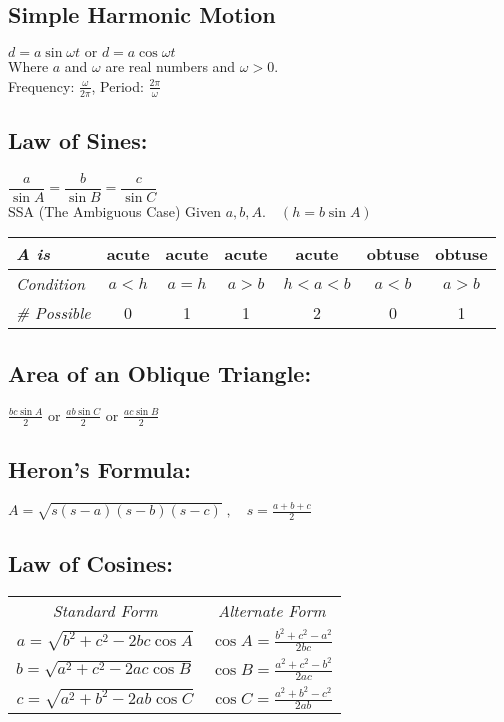 \documentclass{amsart}
\begin{document}
\begin{multicols}{2}
    \subsection*{Simple Harmonic Motion}$d=a\sin\omega t\text{ or }d=a\cos\omega t$\hfill \\
    Where $a$ and $\omega$ are real numbers and $\omega > 0$.\\
    Frequency: $\frac{\omega}{2\pi}$, Period: $\frac{2\pi}{\omega}$
    \subsection*{ Law of Sines:}
    $\dfrac{a}{\sin A}=\dfrac{b}{\sin B}=\dfrac{c}{\sin C}$\medskip\\
    SSA (The Ambiguous Case) \hskip 6pt Given $a, b, A.\quad (h=b\sin A)$
    \begin{center}
    \begin{small}\begin{tabular}[c]{|l|cccccc|}\hline
        \textit{A is}&acute&acute&acute&acute&obtuse&obtuse\\\hline
        \textit{Condition}&$a<h$&$a=h$&$a>b$&$h<a<b$&$a<b$&$a>b$\\
        \textit{\# Possible}&0&1&1&2&0&1\\\hline
    \end{tabular}\end{small}
    \end{center}
    \subsection*{Area of an Oblique Triangle:}$\frac{bc\sin A}{2}$ or $\frac{ab\sin C}{2}$ or $\frac{ac\sin B}{2}$
    \subsection*{Heron's Formula:} $A=\sqrt{s(s-a)(s-b)(s-c)}\;,\quad s=\frac{a+b+c}{2}$
    \subsection*{Law of Cosines:}
    \begin{center}
    \begin{tabular}[c]{cc}
        \large{\textit{Standard Form}} &\large{\textit{Alternate Form}}\\
        $a=\sqrt{b^2+c^2-2bc\cos A}$&$\cos A=\frac{b^2+c^2-a^2}{2bc}$\\
        $b=\sqrt{a^2+c^2-2ac\cos B}$&$\cos B=\frac{a^2+c^2-b^2}{2ac}$\\
        $c=\sqrt{a^2+b^2-2ab\cos C}$&$\cos C=\frac{a^2+b^2-c^2}{2ab}$
    \end{tabular}
    \end{center}

\end{multicols}
\end{document}
